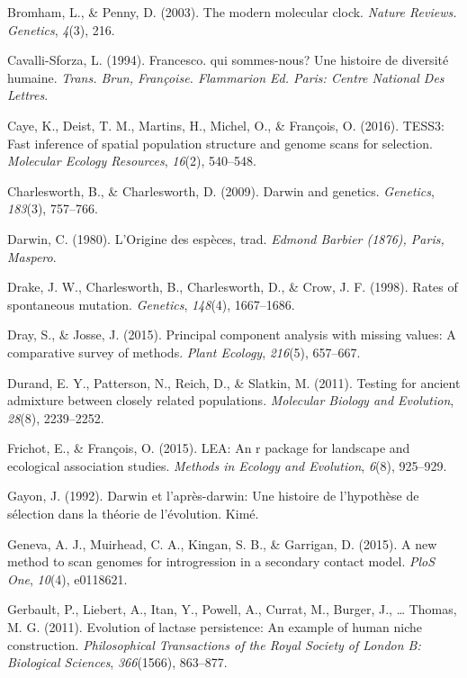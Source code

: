 \documentclass[12pt,a4paper,twoside]{ugathesis}
\theoremstyle{definition}
\theoremstyle{definition}
\theoremstyle{remark}
\begin{document}
\hypertarget{ref-bromham2003modern}{}
Bromham, L., \& Penny, D. (2003). The modern molecular clock.
\emph{Nature Reviews. Genetics}, \emph{4}(3), 216.

\hypertarget{ref-cavalli1994francesco}{}
Cavalli-Sforza, L. (1994). Francesco. qui sommes-nous? Une histoire de
diversité humaine. \emph{Trans. Brun, Françoise. Flammarion Ed. Paris:
Centre National Des Lettres}.

\hypertarget{ref-caye2016tess3}{}
Caye, K., Deist, T. M., Martins, H., Michel, O., \& François, O. (2016).
TESS3: Fast inference of spatial population structure and genome scans
for selection. \emph{Molecular Ecology Resources}, \emph{16}(2),
540--548.

\hypertarget{ref-charlesworth2009darwin}{}
Charlesworth, B., \& Charlesworth, D. (2009). Darwin and genetics.
\emph{Genetics}, \emph{183}(3), 757--766.

\hypertarget{ref-darwin1980origine}{}
Darwin, C. (1980). L'Origine des espèces, trad. \emph{Edmond Barbier
(1876), Paris, Maspero}.

\hypertarget{ref-drake1998rates}{}
Drake, J. W., Charlesworth, B., Charlesworth, D., \& Crow, J. F. (1998).
Rates of spontaneous mutation. \emph{Genetics}, \emph{148}(4),
1667--1686.

\hypertarget{ref-dray2015principal}{}
Dray, S., \& Josse, J. (2015). Principal component analysis with missing
values: A comparative survey of methods. \emph{Plant Ecology},
\emph{216}(5), 657--667.

\hypertarget{ref-durand2011testing}{}
Durand, E. Y., Patterson, N., Reich, D., \& Slatkin, M. (2011). Testing
for ancient admixture between closely related populations.
\emph{Molecular Biology and Evolution}, \emph{28}(8), 2239--2252.

\hypertarget{ref-frichot2015lea}{}
Frichot, E., \& François, O. (2015). LEA: An r package for landscape and
ecological association studies. \emph{Methods in Ecology and Evolution},
\emph{6}(8), 925--929.

\hypertarget{ref-gayon1992darwin}{}
Gayon, J. (1992). Darwin et l'après-darwin: Une histoire de l'hypothèse
de sélection dans la théorie de l'évolution. Kimé.

\hypertarget{ref-geneva2015new}{}
Geneva, A. J., Muirhead, C. A., Kingan, S. B., \& Garrigan, D. (2015). A
new method to scan genomes for introgression in a secondary contact
model. \emph{PloS One}, \emph{10}(4), e0118621.

\hypertarget{ref-gerbault2011evolution}{}
Gerbault, P., Liebert, A., Itan, Y., Powell, A., Currat, M., Burger, J.,
\ldots{} Thomas, M. G. (2011). Evolution of lactase persistence: An
example of human niche construction. \emph{Philosophical Transactions of
the Royal Society of London B: Biological Sciences}, \emph{366}(1566),
863--877.
\end{document}
